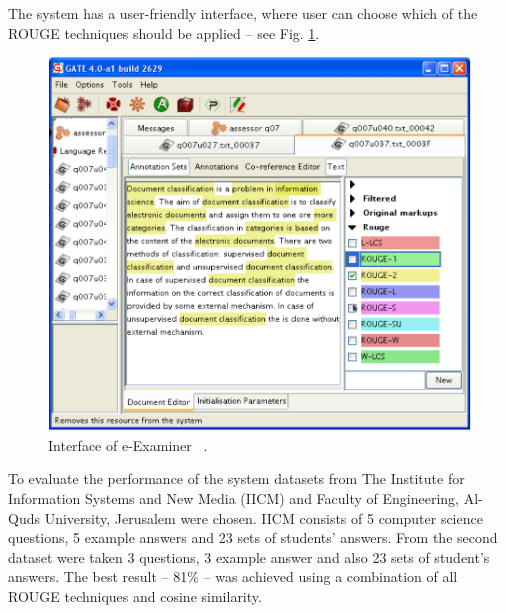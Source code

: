 The system has a user-friendly interface, where user can choose which of the ROUGE techniques should be applied -- see Fig. \ref{fig:e-examiner_Interface}.\\

\begin{figure}[h!]
  \centering
  \includegraphics[width=\textwidth]{img/e-examiner_Interface}
    \caption{ Interface of e-Examiner ~\cite{e-examiner}. }\label{fig:e-examiner_Interface}
\end{figure}

To evaluate the performance of the system datasets from The Institute for Information Systems and New Media (IICM) and Faculty of Engineering, Al-Quds University, Jerusalem were chosen. IICM consists of 5 computer science questions, 5 example answers and 23 sets of students' answers. From the second dataset were taken 3 questions, 3 example answer and also 23 sets of student's answers. The best result -- 81\% -- was achieved using a combination of all ROUGE techniques and cosine similarity.\\

